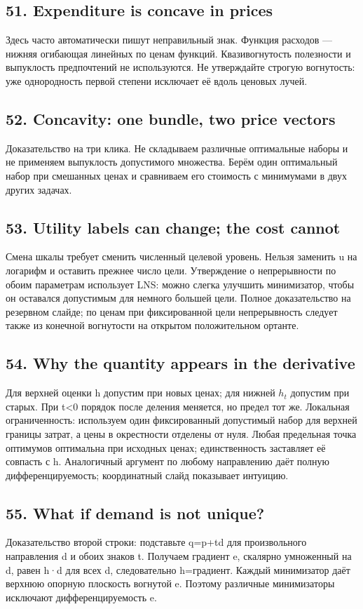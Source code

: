 \documentclass[11pt,a4paper]{article}
\begin{document}
\subsection*{51. Expenditure is concave in prices}
Здесь часто автоматически пишут неправильный знак. Функция расходов — нижняя огибающая линейных по ценам функций. Квазивогнутость полезности и выпуклость предпочтений не используются. Не утверждайте строгую вогнутость: уже однородность первой степени исключает её вдоль ценовых лучей.

\subsection*{52. Concavity: one bundle, two price vectors}
Доказательство на три клика. Не складываем различные оптимальные наборы и не применяем выпуклость допустимого множества. Берём один оптимальный набор при смешанных ценах и сравниваем его стоимость с минимумами в двух других задачах.

\subsection*{53. Utility labels can change; the cost cannot}
Смена шкалы требует сменить численный целевой уровень. Нельзя заменить u на логарифм и оставить прежнее число цели. Утверждение о непрерывности по обоим параметрам использует LNS: можно слегка улучшить минимизатор, чтобы он оставался допустимым для немного большей цели. Полное доказательство на резервном слайде; по ценам при фиксированной цели непрерывность следует также из конечной вогнутости на открытом положительном ортанте.

\subsection*{54. Why the quantity appears in the derivative}
Для верхней оценки h допустим при новых ценах; для нижней $h_t$ допустим при старых. При t<0 порядок после деления меняется, но предел тот же. Локальная ограниченность: используем один фиксированный допустимый набор для верхней границы затрат, а цены в окрестности отделены от нуля. Любая предельная точка оптимумов оптимальна при исходных ценах; единственность заставляет её совпасть с h. Аналогичный аргумент по любому направлению даёт полную дифференцируемость; координатный слайд показывает интуицию.

\subsection*{55. What if demand is not unique?}
Доказательство второй строки: подставьте q=p+td для произвольного направления d и обоих знаков t. Получаем градиент e, скалярно умноженный на d, равен h·d для всех d, следовательно h=градиент. Каждый минимизатор даёт верхнюю опорную плоскость вогнутой e. Поэтому различные минимизаторы исключают дифференцируемость e.
\end{document}
